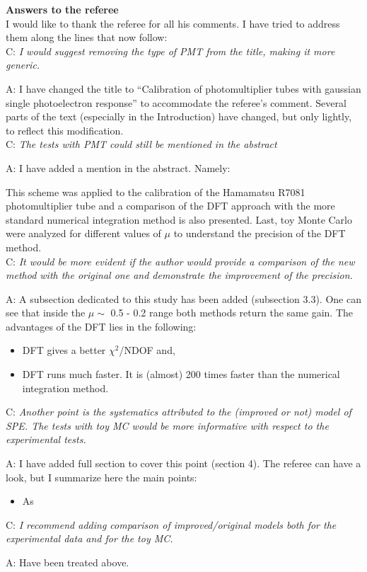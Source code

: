 \documentclass[a4paper,11pt]{article}
\begin{document}
{\bf Answers to the referee}
\\[1ex]

I would like to thank the referee for all his comments. 
I have tried to address them along the lines that now follow:
\\[1ex]

C: \emph{ I would suggest removing the type of PMT from the title, making it more generic. } 
	
A: I have changed the title to ``Calibration of photomultiplier tubes with gaussian single photoelectron response'' 
to accommodate the referee's comment.
Several parts of the text (especially in the Introduction) have changed, but only lightly, to reflect this modification. 
\\[1ex]

C: \emph{The tests with PMT could still be mentioned in the abstract} 

A: I have added a mention in the abstract. Namely: 

This scheme was applied to the calibration of the Hamamatsu R7081 photomultiplier tube and a comparison of the DFT approach with the more standard numerical integration method is also presented.
Last, toy Monte Carlo were analyzed for different values of $\mu$ to understand the precision of the DFT method.
\\[1ex]

C: \emph{ It would be more evident if the author would provide a comparison of the new method with the original one and demonstrate the improvement of the precision. }
	
A: A subsection dedicated to this study has been added (subsection 3.3). 
One can see that inside the $\mu\sim$ 0.5 - 0.2 range both methods return the same gain. 
The advantages of the DFT lies in the following:
\begin{itemize}
\item DFT gives a better $\chi^2$/NDOF and, 
\item DFT runs much faster. 
It is (almost) 200 times faster than the numerical integration method. 
\end{itemize}


C: \emph{Another point is the systematics attributed to the (improved or not) model of SPE. 
The tests with toy MC would be more informative with respect to the experimental tests.}

A: I have added full section to cover this point (section 4). The referee can have a look, but I summarize here the main points: 
\begin{itemize}
\item As
\end{itemize}

C: \emph{I recommend adding comparison of improved/original models both for the experimental data and for the toy MC.}

A: Have been treated above.
\end{document}
